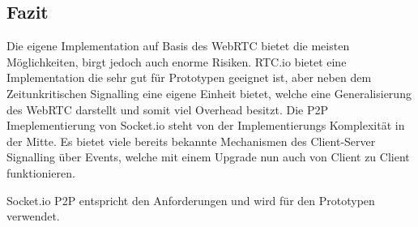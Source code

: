 \subsection{Fazit}
Die eigene Implementation auf Basis des WebRTC bietet die meisten Möglichkeiten, birgt jedoch auch enorme Risiken. RTC.io bietet eine Implementation die sehr gut für Prototypen geeignet ist, aber neben dem Zeitunkritischen Signalling eine eigene Einheit bietet, welche eine Generalisierung des WebRTC darstellt und somit viel Overhead besitzt. Die P2P Imeplementierung von Socket.io steht von der Implementierungs Komplexität in der Mitte. Es bietet viele bereits bekannte Mechanismen des Client-Server Signalling über Events, welche mit einem Upgrade nun auch von Client zu Client funktionieren. 

Socket.io P2P entspricht den Anforderungen und wird für den Prototypen verwendet.
